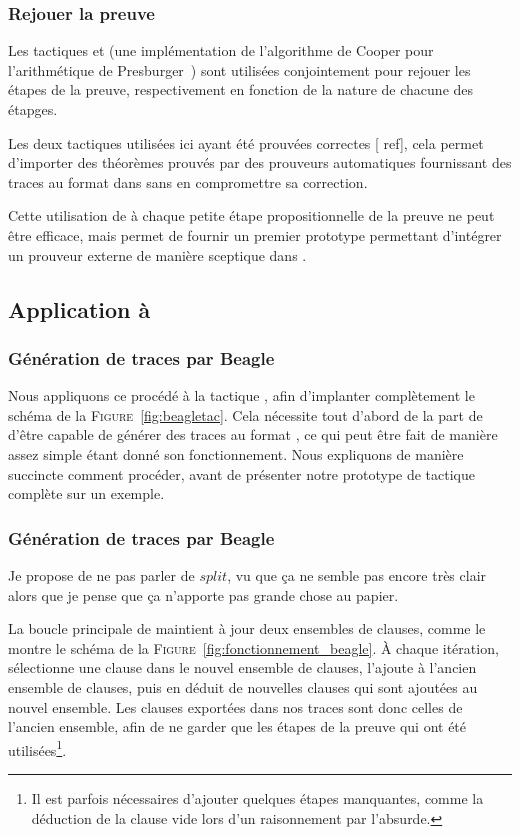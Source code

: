 \subsubsection{Rejouer la preuve}

Les tactiques \metistac et \coopertac (une implémentation de
l'algorithme de Cooper pour l'arithmétique de
Presburger~\cite{Norrish03completeinteger}) sont utilisées conjointement
pour rejouer les étapes de la preuve, respectivement en fonction de la
nature de chacune des étapges.

Les deux tactiques utilisées ici ayant été prouvées correctes [\todo
ref], cela permet d'importer des théorèmes prouvés par des prouveurs
automatiques fournissant des traces au format \tff dans \holfour sans en
compromettre sa correction.

Cette utilisation de \metistac à chaque petite étape propositionnelle de
la preuve ne peut être efficace, mais permet de fournir un premier
prototype permettant d'intégrer un prouveur externe de manière sceptique
dans \holfour.


\subsection{Application à \beagle}

\subsubsection{Génération de traces par Beagle}
Nous appliquons ce procédé à la tactique \beagletac, afin d'implanter
complètement le schéma de la \textsc{Figure}~\ref{fig:beagletac}. Cela
nécessite tout d'abord de la part de \beagle d'être capable de générer
des traces au format \tff, ce qui peut être fait de manière assez simple
étant donné son fonctionnement. Nous expliquons de manière succincte
comment procéder, avant de présenter notre prototype de tactique
\beagletac complète sur un exemple.


\subsubsection{Génération de traces par Beagle}
\todo Je propose de ne pas parler de $split$, vu que ça ne semble pas
encore très clair alors que je pense que ça n'apporte pas grande chose
au papier.

La boucle principale de \beagle maintient à jour deux ensembles de
clauses, comme le montre le schéma de la
\textsc{Figure}~\ref{fig:fonctionnement_beagle}. À chaque itération,
\beagle sélectionne une clause dans le nouvel ensemble de clauses,
l'ajoute à l'ancien ensemble de clauses, puis en déduit de nouvelles
clauses qui sont ajoutées au nouvel ensemble. Les clauses exportées dans
nos traces sont donc celles de l'ancien ensemble, afin de ne garder que
les étapes de la preuve qui ont été utilisées\footnote{Il est parfois
  nécessaires d'ajouter quelques étapes manquantes, comme la déduction
  de la clause vide lors d'un raisonnement par l'absurde.}.

